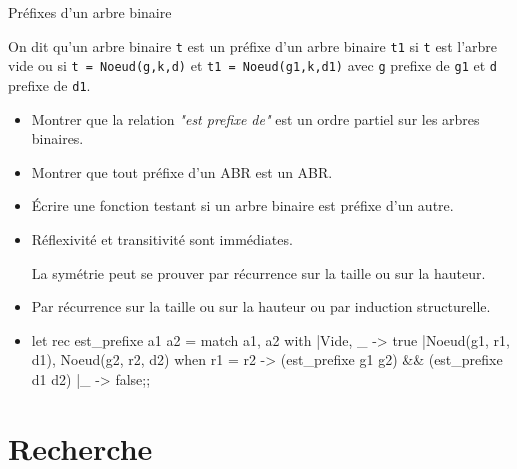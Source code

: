 \begin{exo}{Préfixes d’un arbre binaire}{}

On dit qu’un arbre binaire {\tt t} est un préfixe d’un arbre binaire {\tt t1} si {\tt t} est l’arbre vide ou si {\tt t = Noeud(g,k,d)} et {\tt t1 = Noeud(g1,k,d1)} avec {\tt g} prefixe de {\tt g1} et {\tt d} prefixe de {\tt d1}.

\begin{itemize}
\item Montrer que la relation {\it "est prefixe de"} est un ordre partiel sur les arbres binaires.

\item Montrer que tout préfixe d’un ABR est un ABR.

\item Écrire une fonction testant si un arbre binaire est préfixe d’un autre.
\end{itemize}
\reponse
\begin{itemize}
\item Réflexivité et transitivité sont immédiates.

La symétrie peut se prouver par récurrence sur la taille ou sur la hauteur.

\item Par récurrence sur la taille ou sur la hauteur ou par induction structurelle.

\item 
\begin{ocaml}
let rec est_prefixe a1 a2 =
  match a1, a2 with
  |Vide, _ -> true
  |Noeud(g1, r1, d1), Noeud(g2, r2, d2) when r1 = r2
      -> (est_prefixe g1 g2) && (est_prefixe d1 d2)
  |_ -> false;;
\end{ocaml}
\end{itemize}
\end{exo}
\section{Recherche}
